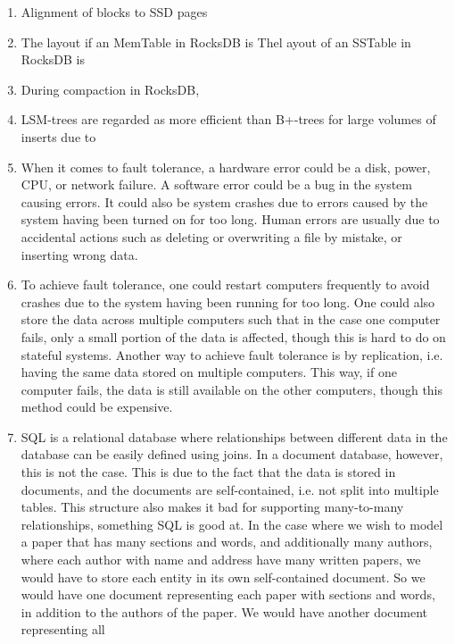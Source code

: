 \begin{enumerate}
    \item 
        Alignment of blocks to SSD pages 
    \item 
        The layout if an MemTable in RocksDB is
        Thel ayout of an SSTable in RocksDB is 
    \item 
        During compaction in RocksDB, 
    \item 
        LSM-trees are regarded as more efficient than B+-trees for large volumes
        of inserts due to
    \item 
        When it comes to fault tolerance, a hardware error could be a disk, 
        power, CPU, or network failure. A software error could be a bug in the
        system causing errors. It could also be system crashes due to errors 
        caused by the system having been turned on for too long. Human errors 
        are usually due to accidental actions such as deleting or overwriting a 
        file by mistake, or inserting wrong data. 
    \item 
        To achieve fault tolerance, one could restart computers frequently to
        avoid crashes due to the system having been running for too long. One 
        could also store the data across multiple computers such that in the 
        case one computer fails, only a small portion of the data is affected, 
        though this is hard to do on stateful systems. Another way to achieve
        fault tolerance is by replication, i.e. having the same data stored on
        multiple computers. This way, if one computer fails, the data is still
        available on the other computers, though this method could be expensive.
    \item
        SQL is a relational database where relationships between different data
        in the database can be easily defined using joins. In a document 
        database, however, this is not the case. This is due to the fact that 
        the data is stored in documents, and the documents are self-contained,
        i.e. not split into multiple tables. This structure also makes it bad 
        for supporting many-to-many relationships, something SQL is good at. In
        the case where we wish to model a paper that has many sections and 
        words, and additionally many authors, where each author with name and 
        address have many written papers, we would have to store each entity
        in its own self-contained document. So we would have one document
        representing each paper with sections and words, in addition to the 
        authors of the paper. We would have another document representing all 

\end{enumerate}
